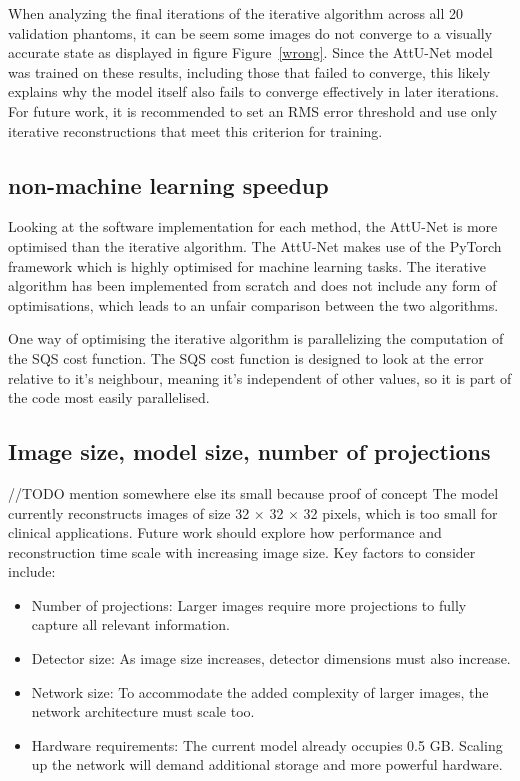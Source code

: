 \documentclass{article}
\begin{document}
When analyzing the final iterations of the iterative algorithm across all 20 validation phantoms, it can be seem some images do not converge to a visually accurate state as displayed in figure Figure~\ref{wrong}. Since the AttU-Net model was trained on these results, including those that failed to converge, this likely explains why the model itself also fails to converge effectively in later iterations. For future work, it is recommended to set an RMS error threshold and use only iterative reconstructions that meet this criterion for training.

\subsection{non-machine learning speedup}

Looking at the software implementation for each method, the AttU-Net is more optimised than the iterative algorithm. The AttU-Net makes use of the PyTorch framework which is highly optimised for machine learning tasks. The iterative algorithm has been implemented from scratch and does not include any form of optimisations, which leads to an unfair comparison between the two algorithms.

One way of optimising the iterative algorithm is parallelizing the computation of the SQS cost function. The SQS cost function is designed to look at the error relative to it's neighbour, meaning it's independent of other values, so it is part of the code most easily parallelised.

\subsection{Image size, model size, number of projections}

//TODO mention somewhere else its small because proof of concept
The model currently reconstructs images of size 32 $\times$ 32 $\times$ 32 pixels, which is too small for clinical applications. Future work should explore how performance and reconstruction time scale with increasing image size. Key factors to consider include:

\begin{itemize}
\item Number of projections: Larger images require more projections to fully capture all relevant information.
\item Detector size: As image size increases, detector dimensions must also increase.
\item Network size: To accommodate the added complexity of larger images, the network architecture must scale too.
\item Hardware requirements: The current model already occupies 0.5 GB. Scaling up the network will demand additional storage and more powerful hardware.
\end{itemize}
\end{document}
